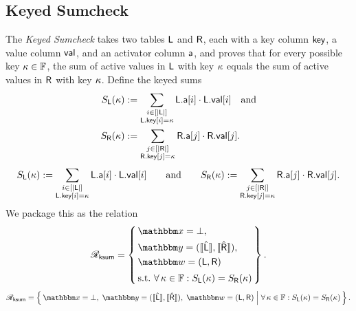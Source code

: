 \subsection{Keyed Sumcheck}
The \emph{Keyed Sumcheck} takes two tables $\mathsf{L}$ and $\mathsf{R}$, each with a key column $\mathsf{key}$, a value column $\mathsf{val}$, and an activator column $\mathsf{a}$, and proves that for every possible key $\kappa \in \mathbb{F}$, the sum of active values in $\mathsf{L}$ with key $\kappa$ equals the sum of active values in $\mathsf{R}$ with key $\kappa$. Define the keyed sums
\ifsp
\begin{align*}
    S_{\mathsf{L}}(\kappa) &:= \sum_{\substack{i \in [|\mathsf{L}|] \\ \mathsf{L}.\mathsf{key}[i] = \kappa}} \mathsf{L}.\mathsf{a}[i]\cdot\mathsf{L}.\mathsf{val}[i]
    \quad\text{and}\\
    S_{\mathsf{R}}(\kappa) &:= \sum_{\substack{j \in [|\mathsf{R}|] \\ \mathsf{R}.\mathsf{key}[j] = \kappa}} \mathsf{R}.\mathsf{a}[j]\cdot\mathsf{R}.\mathsf{val}[j].
\end{align*}
\else
\begin{displaymath}
    S_{\mathsf{L}}(\kappa) := \sum_{\substack{i \in [|\mathsf{L}|] \\ \mathsf{L}.\mathsf{key}[i] = \kappa}} \mathsf{L}.\mathsf{a}[i]\cdot\mathsf{L}.\mathsf{val}[i]
    \qquad\text{and}\qquad
    S_{\mathsf{R}}(\kappa) := \sum_{\substack{j \in [|\mathsf{R}|] \\ \mathsf{R}.\mathsf{key}[j] = \kappa}} \mathsf{R}.\mathsf{a}[j]\cdot\mathsf{R}.\mathsf{val}[j].
\end{displaymath}
\fi
We package this as the relation
\ifsp
\begin{displaymath}
\NPRelation_{\mathsf{ksum}} = \left\{\,
  \begin{aligned}
    & \NPInstance = \bot,\\
    & \NPInstancey = (\Oracle{\hat{\Left}}, \Oracle{\hat{\Right}}),\\
    & \NPWitness = (\Left, \Right)\\[2pt]
    & \text{s.t.}\ \forall\, \elem \in \F : S_\Left(\elem) = S_\Right(\elem)
  \end{aligned}
\,\right\}.
\end{displaymath}
\else
\begin{displaymath}
\NPRelation_{\mathsf{ksum}} = \left\{\,
  \NPInstance = \bot,\;
  \NPInstancey = (\Oracle{\hat{\Left}}, \Oracle{\hat{\Right}}),\;
  \NPWitness = (\Left, \Right)
  \;\middle|\;
    \forall\, \elem \in \F : S_\Left(\elem) = S_\Right(\elem)
\,\right\}.
\end{displaymath}
\fi

